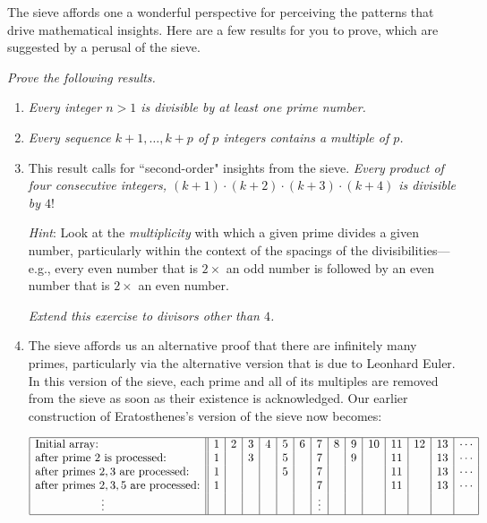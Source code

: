 \begin{itemize}
\begin{itemize}
\bigskip

The sieve affords one a wonderful perspective for perceiving the patterns that drive mathematical insights.  Here are a few results for you to prove, which are suggested by a perusal of the sieve.

\smallskip

{\em Prove the following results.}
     \begin{enumerate}
     \item
{\em 
Every integer $n>1$ is divisible by at least one prime number.
}

     \medskip\item
{\em 
Every sequence $k+1, \ldots, k+p$ of $p$ integers contains a multiple of $p$.
}

      \medskip\item This result calls for ``second-order" insights from the sieve.
{\em 
Every product of four consecutive integers, $(k+1) \cdot (k+2) \cdot (k+3) \cdot (k+4)$ is divisible by $4!$
}

\smallskip

{\em Hint}:  Look at the {\em multiplicity} with which a given prime divides a given number, particularly within the context of the spacings of the divisibilities---e.g., every even number that is $2 \times$ an odd number is followed by an even number that is $2 \times$ an even number.  

\smallskip

{\em Extend this exercise to divisors other than $4$.}

\medskip\item
The sieve affords us an alternative proof that there are infinitely many primes, particularly via the alternative version that is due to Leonhard Euler.  In this version of the sieve, each prime and all of its multiples are removed from the sieve as soon as their existence is acknowledged.  Our earlier construction of Eratosthenes's version of the sieve now becomes:

\medskip

$\begin{array}{|l||c|c|c|c|c|c|c|c|c|c|c|c|c|c|}
\hline
\mbox{Initial array:} &
1 & 2 & 3 & 4 & 5 & 6 & 7 & 8 & 9 & 10 & 11 & 12 & 13 & \cdots \\
\mbox{after prime $2$ is processed:} &
1 &  & 3 &  & 5 &  & 7 &  & 9 &  & 11 &  & 13 & \cdots \\
\mbox{after primes $2, 3$ are processed:} &
1 &  &  &  & 5 &  & 7 &  &  &  & 11 &  & 13 & \cdots \\
\mbox{after primes $2, 3, 5$ are processed:} &
1 &  &  &  &  &  & 7 &  &  &  & 11 &  & 13 & \cdots \\
\hspace*{.8in} \vdots  &
 &  &  &  &  &  & \vdots &  &  &  &  &  &  & \\
\hline
\end{array}$


\end{enumerate}
\end{itemize}
\end{itemize}
